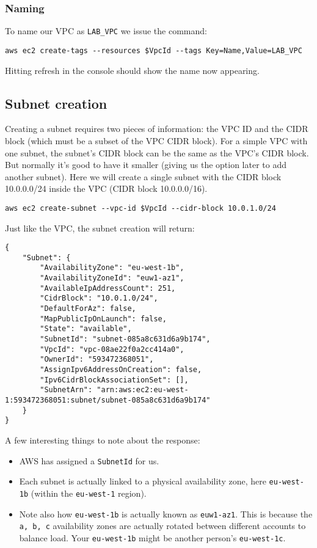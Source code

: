 \documentclass{pgnotes}
\begin{document}
\subsubsection{Naming}

To name our VPC as \texttt{LAB\_VPC} we issue the command:

\begin{verbatim}
aws ec2 create-tags --resources $VpcId --tags Key=Name,Value=LAB_VPC
\end{verbatim}

Hitting refresh in the console should show the name now appearing.

\subsection{Subnet creation}\label{subnet-creation}

Creating a subnet requires two pieces of information: the VPC ID and the
CIDR block (which must be a subset of the VPC CIDR block). For a simple
VPC with one subnet, the subnet's CIDR block can be the same as the
VPC's CIDR block. But normally it's good to have it smaller (giving us
the option later to add another subnet). Here we will create a single
subnet with the CIDR block 10.0.0.0/24 inside the VPC (CIDR block
10.0.0.0/16).

\begin{verbatim}
aws ec2 create-subnet --vpc-id $VpcId --cidr-block 10.0.1.0/24
\end{verbatim}

Just like the VPC, the subnet creation will return:

\begin{verbatim}
{
    "Subnet": {
        "AvailabilityZone": "eu-west-1b",
        "AvailabilityZoneId": "euw1-az1",
        "AvailableIpAddressCount": 251,
        "CidrBlock": "10.0.1.0/24",
        "DefaultForAz": false,
        "MapPublicIpOnLaunch": false,
        "State": "available",
        "SubnetId": "subnet-085a8c631d6a9b174",
        "VpcId": "vpc-08ae22f0a2cc414a0",
        "OwnerId": "593472368051",
        "AssignIpv6AddressOnCreation": false,
        "Ipv6CidrBlockAssociationSet": [],
        "SubnetArn": "arn:aws:ec2:eu-west-1:593472368051:subnet/subnet-085a8c631d6a9b174"
    }
}
\end{verbatim}

A few interesting things to note about the response:

\begin{itemize}
\item
  AWS has assigned a \texttt{SubnetId} for us.
\item
  Each subnet is actually linked to a physical availability zone, here
  \texttt{eu-west-1b} (within the \texttt{eu-west-1} region).
\item
  Note also how \texttt{eu-west-1b} is actually known as
  \texttt{euw1-az1}. This is because the \texttt{a,\ b,\ c} availability
  zones are actually rotated between different accounts to balance load.
  Your \texttt{eu-west-1b} might be another person's
  \texttt{eu-west-1c}.
\end{itemize}
\end{document}
